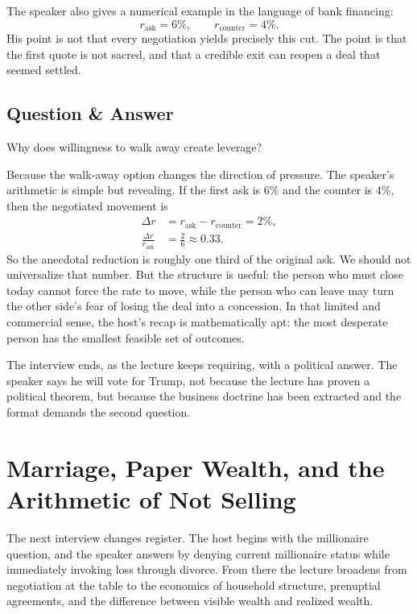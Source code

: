 The speaker also gives a numerical example in the language of bank financing:
\begin{equation}
r_{\text{ask}}=6\%,\qquad r_{\text{counter}}=4\%.
\end{equation}
His point is not that every negotiation yields precisely this cut. The point is that the first quote is not sacred, and that a credible exit can reopen a deal that seemed settled.

\subsection{Question \& Answer}

Why does willingness to walk away create leverage?

Because the walk-away option changes the direction of pressure. The speaker's arithmetic is simple but revealing. If the first ask is \(6\%\) and the counter is \(4\%\), then the negotiated movement is
\begin{align}
\Delta r &= r_{\text{ask}}-r_{\text{counter}} = 2\%,\\
\frac{\Delta r}{r_{\text{ask}}} &= \frac{2}{6} \approx 0.33.
\end{align}
So the anecdotal reduction is roughly one third of the original ask. We should not universalize that number. But the structure is useful: the person who must close today cannot force the rate to move, while the person who can leave may turn the other side's fear of losing the deal into a concession. In that limited and commercial sense, the host's recap is mathematically apt: the most desperate person has the smallest feasible set of outcomes.

The interview ends, as the lecture keeps requiring, with a political answer. The speaker says he will vote for Trump, not because the lecture has proven a political theorem, but because the business doctrine has been extracted and the format demands the second question.

\section{Marriage, Paper Wealth, and the Arithmetic of Not Selling}

The next interview changes register. The host begins with the millionaire question, and the speaker answers by denying current millionaire status while immediately invoking loss through divorce. From there the lecture broadens from negotiation at the table to the economics of household structure, prenuptial agreements, and the difference between visible wealth and realized wealth.

